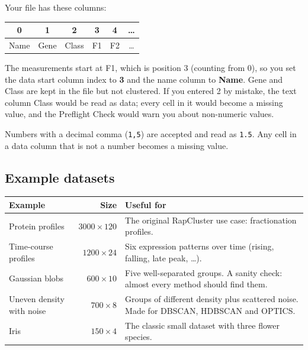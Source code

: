 \documentclass[11pt,a4paper]{article}
\begin{document}
\begin{example}
Your file has these columns:

\begin{center}
\begin{tabular}{cccccc}
\toprule
0 & 1 & 2 & 3 & 4 & \dots\\
\midrule
Name & Gene & Class & F1 & F2 & \dots\\
\bottomrule
\end{tabular}
\end{center}

The measurements start at F1, which is position 3 (counting from 0), so you set the data start column index to
\textbf{3} and the name column to \textbf{Name}. Gene and Class are kept in the file but not clustered. If you
entered 2 by mistake, the text column Class would be read as data; every cell in it would become a missing value,
and the Preflight Check would warn you about non-numeric values.
\end{example}

Numbers with a decimal comma (\texttt{1,5}) are accepted and read as \texttt{1.5}. Any cell in a data column that
is not a number becomes a missing value.

\subsection{Example datasets}

\begin{center}
\begin{tabularx}{\textwidth}{lrL}
\toprule
Example & Size & Useful for\\
\midrule
Protein profiles & $3000\times120$ & The original RapCluster use case: fractionation profiles.\\
Time-course profiles & $1200\times24$ & Six expression patterns over time (rising, falling, late peak, \dots).\\
Gaussian blobs & $600\times10$ & Five well-separated groups. A sanity check: almost every method should find them.\\
Uneven density with noise & $700\times8$ & Groups of different density plus scattered noise. Made for DBSCAN,
  HDBSCAN and OPTICS.\\
Iris & $150\times4$ & The classic small dataset with three flower species.\\
\bottomrule
\end{tabularx}
\end{center}
\end{document}
